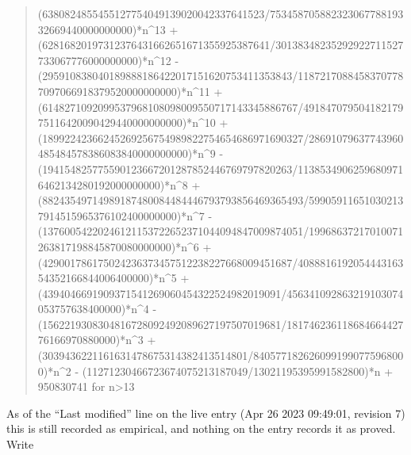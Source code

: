 \documentclass[11pt,a4paper]{article}
\theoremstyle{plain}
\theoremstyle{definition}
\begin{document}
\begin{quote}
(6380824855455127754049139020042337641523/75345870588232306778819332669440000000000)*n\^{}13 + (62816820197312376431662651671355925387641/30138348235292922711527733067776000000000)*n\^{}12 - (295910838040189888186422017151620753411353843/11872170884583707787097066918379520000000000)*n\^{}11 + (6148271092099537968108098009550717143345886767/49184707950418217975116420090429440000000000)*n\^{}10 + (18992242366245269256754989822754654686971690327/28691079637743960485484578386083840000000000)*n\^{}9 - (194154825775590123667201287852446769797820263/11385349062596809716462134280192000000000)*n\^{}8 + (88243549714989187480084484446793793856469365493/599059116510302137914515965376102400000000)*n\^{}7 - (13760054220246121153722652371044094847009874051/19968637217010071263817198845870080000000)*n\^{}6 + (429001786175024236373457512238227668009451687/408881619205444316354352166844006400000)*n\^{}5 + (4394046691909371541269060454322524982019091/456341092863219103074053757638400000)*n\^{}4 - (1562219308304816728092492089627197507019681/18174623611868466442776166970880000)*n\^{}3 + (3039436221161631478675314382413514801/8405771826260991990775968000)*n\^{}2 - (11271230466723674075213187049/13021195395991582800)*n + 950830741 for n>13
\end{quote}
As of the ``Last modified'' line on the live entry (Apr 26 2023 09:49:01, revision 7) this is still
recorded as empirical, and nothing on the entry records it as proved. Write
\end{document}
